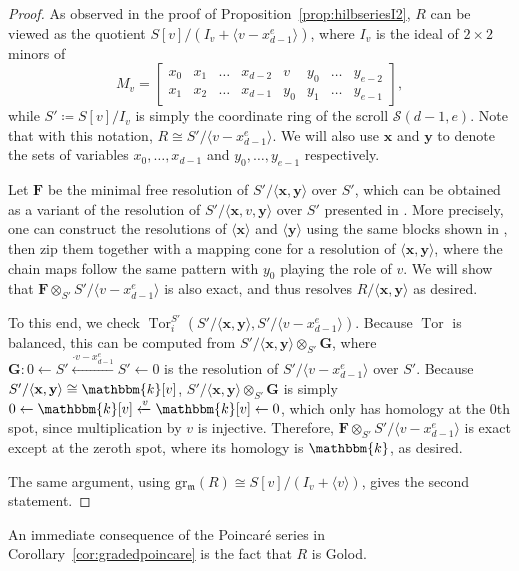 \documentclass[12pt,reqno]{amsart}
\theoremstyle{definition}
\theoremstyle{remark}
\newcommand{\Tor}{\operatorname{Tor}}
\newcommand{\grm}{\operatorname{gr_\frakm}}
\newcommand{\grmR}{{\grm(R)}}
\newcommand{\bbk}{\mathbbm{k}}
\newcommand{\calS}{{\mathcal{S}}}
\newcommand{\frakm}{{\mathfrak{m}}}
\newcommand{\bfF}{{\mathbf{F}}}
\newcommand{\bfG}{{\mathbf{G}}}
\newcommand{\bfx}{{\mathbf{x}}}
\newcommand{\bfy}{{\mathbf{y}}}
\newcommand{\ideal}[1]{{\langle #1 \rangle}}
\begin{document}
\begin{proof}
As observed in the proof of Proposition~\ref{prop:hilbseriesI2}, $R$ can be viewed as the quotient $S[v]/(I_v + \ideal{v-x_{d-1}^e})$, where $I_v$ is the ideal of $2\times2$ minors of 
\[
M_v = \begin{bmatrix}
x_0 & x_1 & \ldots & x_{d-2} & v & y_0 & \ldots & y_{e-2}\\
x_1 & x_2 & \ldots & x_{d-1} & y_0 & y_1 & \ldots & y_{e-1}
\end{bmatrix},
\]
while $S' \coloneqq S[v]/I_v$ is simply the coordinate ring of the scroll $\calS(d-1,e)$. Note that with this notation, $R \cong S'/\ideal{v-x_{d-1}^e}$. We will also use $\bfx$ and $\bfy$ to denote the sets of variables $x_0, \ldots, x_{d-1}$ and $y_0, \ldots, y_{e-1}$ respectively. 

Let $\bfF$ be the minimal free resolution of $S'/\ideal{\bfx, \bfy}$ over $S'$, which can be obtained as a variant of the resolution of $S'/\ideal{\bfx, v, \bfy}$ over $S'$ presented in \cite[Section~4]{msTowardFreeResOScrolls}. More precisely, one can construct the resolutions of $\ideal{\bfx}$ and $\ideal{\bfy}$ using the same blocks shown in \cite{msTowardFreeResOScrolls}, then zip them together with a mapping cone for a resolution of $\ideal{\bfx, \bfy}$, where the chain maps follow the same pattern with $y_0$ playing the role of $v$. We will show that $\bfF \otimes_{S'} S'/\ideal{v-x_{d-1}^e}$ is also exact, and thus resolves $R/\ideal{\bfx, \bfy}$ as desired. 

To this end, we check $\Tor_i^{S'}(S'/\ideal{\bfx, \bfy}, S'/\ideal{v-x_{d-1}^e})$. Because $\Tor$ is balanced, this can be computed from $S'/\ideal{\bfx, \bfy} \otimes_{S'} \bfG$, where $\bfG: 0 \leftarrow S' \xleftarrow{\cdot v-x_{d-1}^e} S' \leftarrow 0$ is the resolution of $S'/\ideal{v-x_{d-1}^e}$ over $S'$. Because $S'/\ideal{\bfx, \bfy} \cong \bbk[v]$, $S'/\ideal{\bfx, \bfy} \otimes_{S'} \bfG$ is simply $0 \leftarrow \bbk[v] \xleftarrow{v} \bbk[v] \leftarrow 0$, which only has homology at the $0$th spot, since multiplication by $v$ is injective. Therefore, $\bfF \otimes_{S'} S'/\ideal{v-x_{d-1}^e}$ is exact except at the zeroth spot, where its homology is $\bbk$, as desired. 

The same argument, using $\grmR \cong S[v]/(I_v + \ideal{v})$, gives the second statement.
\end{proof}

An immediate consequence of the Poincar\'e series in Corollary~\ref{cor:gradedpoincare} is the fact that $R$ is Golod. 
\end{document}
